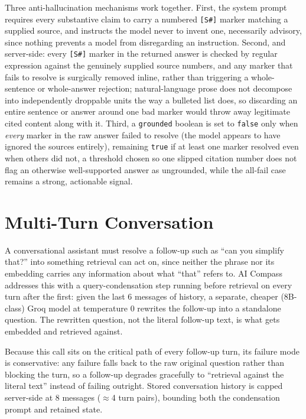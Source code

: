 Three anti-hallucination mechanisms work together. First, the system prompt requires every substantive claim to carry a numbered \texttt{[S\#]} marker matching a supplied source, and instructs the model never to invent one, necessarily advisory, since nothing prevents a model from disregarding an instruction. Second, and server-side: every \texttt{[S\#]} marker in the returned answer is checked by regular expression against the genuinely supplied source numbers, and any marker that fails to resolve is surgically removed inline, rather than triggering a whole-sentence or whole-answer rejection; natural-language prose does not decompose into independently droppable units the way a bulleted list does, so discarding an entire sentence or answer around one bad marker would throw away legitimate cited content along with it. Third, a \texttt{grounded} boolean is set to \texttt{false} only when \emph{every} marker in the raw answer failed to resolve (the model appears to have ignored the sources entirely), remaining \texttt{true} if at least one marker resolved even when others did not, a threshold chosen so one slipped citation number does not flag an otherwise well-supported answer as ungrounded, while the all-fail case remains a strong, actionable signal.

\section{Multi-Turn Conversation}
\label{sec:rag-multiturn}

A conversational assistant must resolve a follow-up such as ``can you simplify that?'' into something retrieval can act on, since neither the phrase nor its embedding carries any information about what ``that'' refers to. AI Compass addresses this with a query-condensation step running before retrieval on every turn after the first: given the last 6 messages of history, a separate, cheaper (8B-class) Groq model at temperature 0 rewrites the follow-up into a standalone question. The rewritten question, not the literal follow-up text, is what gets embedded and retrieved against.

Because this call sits on the critical path of every follow-up turn, its failure mode is conservative: any failure falls back to the raw original question rather than blocking the turn, so a follow-up degrades gracefully to ``retrieval against the literal text'' instead of failing outright. Stored conversation history is capped server-side at 8 messages ($\approx$4 turn pairs), bounding both the condensation prompt and retained state.

